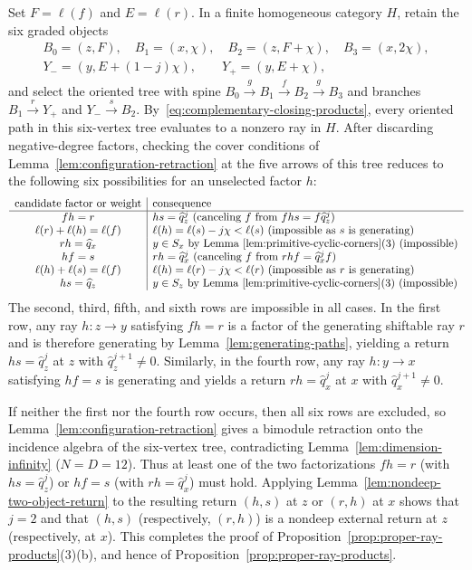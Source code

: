 Set $F=\ell(f)$ and $E=\ell(r)$. In a finite homogeneous category $H$, retain the six graded objects
\[
  \begin{gathered}
  B_0=(z,F),\quad B_1=(x,\chi),\quad B_2=(z,F+\chi),\quad B_3=(x,2\chi),\\
  Y_-=(y,E+(1-j)\chi),\qquad Y_+=(y,E+\chi),
  \end{gathered}
\]
and select the oriented tree with spine $B_0\xrightarrow{g}B_1\xrightarrow{f}B_2\xrightarrow{g}B_3$ and branches $B_1\xrightarrow{r}Y_+$ and $Y_-\xrightarrow{s}B_2$. By~\eqref{eq:complementary-closing-products}, every oriented path in this six-vertex tree evaluates to a nonzero ray in $H$. After discarding negative-degree factors, checking the cover conditions of Lemma~\ref{lem:configuration-retraction} at the five arrows of this tree reduces to the following six possibilities for an unselected factor $h$:
\[
  \begin{array}{c|l}
  \text{candidate factor or weight}&\text{consequence}\\ \hline
  fh=r&hs=\widehat q_z^j\text{ (canceling }f\text{ from }fhs=f\widehat q_z^j\text{)}\\
  \ell(r)+\ell(h)=\ell(f)&\ell(h)=\ell(s)-j\chi<\ell(s)\text{ (impossible as }s\text{ is generating)}\\
  rh=\widehat q_x&y\in S_x\text{ by Lemma~\ref{lem:primitive-cyclic-corners}(3) (impossible)}\\
  hf=s&rh=\widehat q_x^j\text{ (canceling }f\text{ from }rhf=\widehat q_x^jf\text{)}\\
  \ell(h)+\ell(s)=\ell(f)&\ell(h)=\ell(r)-j\chi<\ell(r)\text{ (impossible as }r\text{ is generating)}\\
  hs=\widehat q_z&y\in S_z\text{ by Lemma~\ref{lem:primitive-cyclic-corners}(3) (impossible)}
  \end{array}
\]
The second, third, fifth, and sixth rows are impossible in all cases. In the first row, any ray $h\colon z\to y$ satisfying $fh=r$ is a factor of the generating shiftable ray $r$ and is therefore generating by Lemma~\ref{lem:generating-paths}, yielding a return $hs=\widehat q_z^j$ at $z$ with $\widehat q_z^{j+1}\ne0$. Similarly, in the fourth row, any ray $h\colon y\to x$ satisfying $hf=s$ is generating and yields a return $rh=\widehat q_x^j$ at $x$ with $\widehat q_x^{j+1}\ne0$.

If neither the first nor the fourth row occurs, then all six rows are excluded, so Lemma~\ref{lem:configuration-retraction} gives a bimodule retraction onto the incidence algebra of the six-vertex tree, contradicting Lemma~\ref{lem:dimension-infinity} ($N=D=12$). Thus at least one of the two factorizations $fh=r$ (with $hs=\widehat q_z^j$) or $hf=s$ (with $rh=\widehat q_x^j$) must hold. Applying Lemma~\ref{lem:nondeep-two-object-return} to the resulting return $(h,s)$ at $z$ or $(r,h)$ at $x$ shows that $j=2$ and that $(h,s)$ (respectively, $(r,h)$) is a nondeep external return at $z$ (respectively, at $x$). This completes the proof of Proposition~\ref{prop:proper-ray-products}(3)(b), and hence of Proposition~\ref{prop:proper-ray-products}.
